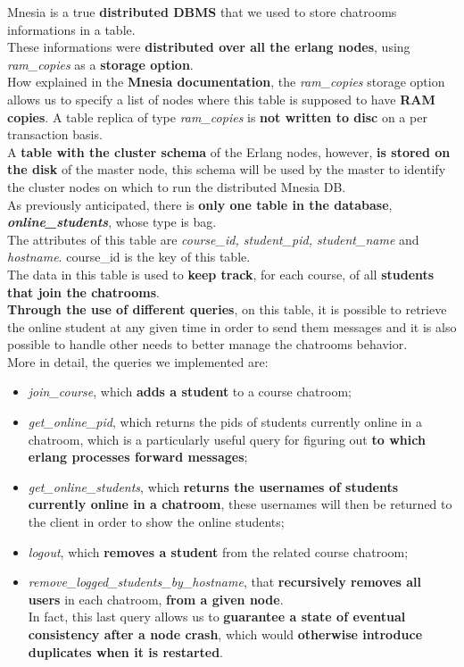 Mnesia is a true \textbf{distributed DBMS} that we used to store chatrooms informations in a table.\\
These informations were \textbf{distributed over all the erlang nodes}, using \textit{ram\_copies} as a \textbf{storage option}.\\
How explained in the \textbf{Mnesia documentation}, the \textit{ram\_copies} storage option allows us to specify a list of nodes where this table is supposed to have \textbf{RAM copies}. A table replica of type \textit{ram\_copies} is \textbf{not written to disc} on a per transaction basis.\\
A \textbf{table with the cluster schema} of the Erlang nodes, however, \textbf{is stored on the disk} of the master node, this schema will be used by the master to identify the cluster nodes on which to run the distributed Mnesia DB.\\

As previously anticipated, there is \textbf{only one table in the database}, \textbf{\textit{online\_students}}, whose type is bag.\\
The attributes of this table are \textit{course\_id, student\_pid, student\_name} and \textit{hostname}. course\_id is the key of this table.\\
The data in this table is used to \textbf{keep track}, for each course, of all \textbf{students that join the chatrooms}.\\
\textbf{Through the use of different queries}, on this table, it is possible to retrieve the online student at any given time in order to send them messages and it is also possible to handle other needs to better manage the chatrooms behavior. \\

More in detail, the queries we implemented are:
\begin{itemize}
    \item \textit{join\_course}, which \textbf{adds a student} to a course chatroom;
    \item \textit{get\_online\_pid}, which returns the pids of students currently online in a chatroom, which is a particularly useful query for figuring out \textbf{to which erlang processes forward messages};
    \item \textit{get\_online\_students}, which \textbf{returns the usernames of students currently online in a chatroom}, these usernames will then be returned to the client in order to show the online students;
    \item \textit{logout}, which \textbf{removes a student} from the related course chatroom;
    \item \textit{remove\_logged\_students\_by\_hostname},  that \textbf{recursively removes all users} in each chatroom, \textbf{from a given node}.\\
    In fact, this last query allows us to \textbf{ guarantee a state of eventual consistency after a node crash}, which would \textbf{otherwise introduce duplicates when it is restarted}.
\end{itemize}

